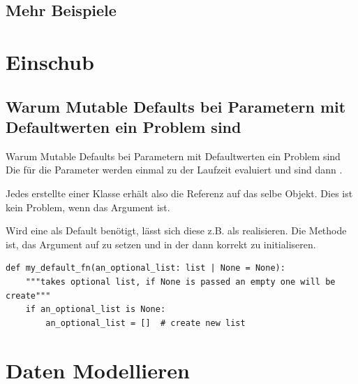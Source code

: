 \documentclass[12pt, aspectratio=169, usepdftitle=false]{beamer}
\newcommand{\pp}[1]{\lpl{#1}}
\begin{document}
\subsection{Mehr Beispiele}

\framecardfragen


\section{Einschub}
\subsection{Warum Mutable Defaults bei Parametern mit Defaultwerten ein Problem sind}

\begin{frame}[fragile]{Warum Mutable Defaults bei Parametern mit Defaultwerten ein Problem sind}
    Die  für die Parameter werden einmal zu  der Laufzeit evaluiert und sind dann .

	\medskip
	
	Jedes erstellte  einer Klasse erhält also die  Referenz auf das selbe Objekt.\newline
	Dies ist kein Problem, wenn das Argument  ist.
	
	\medskip
	
	Wird eine \pp{list} als Default benötigt, lässt sich diese z.B. als \pp{tuple} realisieren.\newline
	Die  Methode ist, das Argument auf \pp{None} zu setzen und in der \pp{__init__} dann korrekt zu initialiseren.
	
	\begin{lstlisting}[language=pytiny]
def my_default_fn(an_optional_list: list | None = None):
    """takes optional list, if None is passed an empty one will be create"""
    if an_optional_list is None:
        an_optional_list = []  # create new list 
	\end{lstlisting}

\end{frame}

\framecardfragen


\section{Daten Modellieren}
\end{document}
